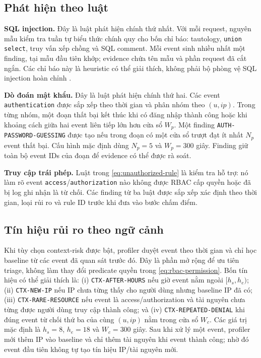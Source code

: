 \subsection{Phát hiện theo luật}
\label{subsec:detection-rules}

\textbf{SQL injection.} Đây là luật phát hiện chính thứ nhất. Với mỗi request,
nguyên mẫu kiểm tra tuần tự biểu thức chính quy cho bốn chỉ báo: tautology,
\texttt{union select}, truy vấn xếp chồng và SQL comment. Mỗi event sinh nhiều
nhất một finding, tại mẫu đầu tiên khớp; evidence chứa tên mẫu và phần request
đã cắt ngắn. Các chỉ báo này là heuristic có thể giải thích, không phải bộ phòng
vệ SQL injection hoàn chỉnh \citep{OWASPSQLi}.

\textbf{Dò đoán mật khẩu.} Đây là luật phát hiện chính thứ hai. Các event
\texttt{authentication} được sắp xếp theo thời gian và phân nhóm theo $(u,ip)$.
Trong từng nhóm, một đoạn thất bại kết thúc khi có đăng nhập thành công hoặc khi
khoảng cách giữa hai event liên tiếp lớn hơn cửa sổ $W_p$. Một finding
\texttt{AUTH-PASSWORD-GUESSING} được tạo nếu trong đoạn có một cửa sổ trượt đạt
ít nhất $N_p$ event thất bại. Cấu hình mặc định dùng $N_p=5$ và $W_p=300$ giây.
Finding giữ toàn bộ event IDs của đoạn để evidence có thể được rà soát.

\textbf{Truy cập trái phép.} Luật trong \eqref{eq:unauthorized-rule} là kiểm
tra hỗ trợ: nó làm rõ event \texttt{access}/\texttt{authorization} nào không
được RBAC cấp quyền hoặc đã bị log ghi nhận là từ chối. Các finding từ ba luật
được sắp xếp xác định theo thời gian, loại rủi ro và rule ID trước khi đưa vào
bước chấm điểm.

\subsection{Tín hiệu rủi ro theo ngữ cảnh}
\label{subsec:context-signals}

Khi tùy chọn context-risk được bật, profiler duyệt event theo thời gian và chỉ
học baseline từ các event đã quan sát trước đó. Đây là phần mở rộng để ưu tiên
triage, không làm thay đổi predicate quyền trong \eqref{eq:rbac-permission}.
Bốn tín hiệu có thể giải thích là: (i) \texttt{CTX-AFTER-HOURS} nếu giờ event
nằm ngoài $[h_s,h_e)$; (ii)
\texttt{CTX-NEW-IP} nếu IP chưa từng thấy cho người dùng nhưng baseline IP đã
có; (iii) \texttt{CTX-RARE-RESOURCE} nếu event là access/authorization và tài
nguyên chưa từng được người dùng truy cập thành công; và (iv)
\texttt{CTX-REPEATED-DENIAL} khi đúng event từ chối thứ ba của cùng $(u,ip)$
nằm trong cửa sổ $W_c$. Các giá trị mặc định là $h_s=8$, $h_e=18$ và
$W_c=300$ giây. Sau khi xử lý một event, profiler mới thêm IP vào baseline và
chỉ thêm tài nguyên khi event thành công; nhờ đó event đầu tiên không tự tạo tín
hiệu IP/tài nguyên mới.

